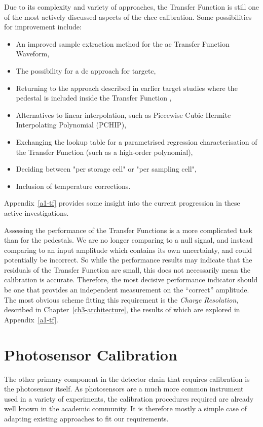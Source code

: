 Due to its complexity and variety of approaches, the Transfer Function is still one of the most actively discussed aspects of the \gls{chec} calibration. Some possibilities for improvement include:
\begin{itemize}
	\item An improved sample extraction method for the \gls{ac} Transfer Function Waveform,
	\item The possibility for a \gls{dc} approach for \gls{targetc},
	\item Returning to the approach described in earlier \gls{target} studies where the pedestal is included inside the Transfer Function \cite{Albert2017},
	\item Alternatives to linear interpolation, such as Piecewise Cubic Hermite Interpolating Polynomial (PCHIP),
	\item Exchanging the lookup table for a parametrised regression characterisation of the Transfer Function (such as a high-order polynomial),
	\item Deciding between "per storage cell" or "per sampling cell",
	\item Inclusion of temperature corrections.
\end{itemize}
Appendix~\ref{a1-tf} provides some insight into the current progression in these active investigations.

Assessing the performance of the Transfer Functions is a more complicated task than for the pedestals. We are no longer comparing to a null signal, and instead comparing to an input amplitude which contains its own uncertainty, and could potentially be incorrect. So while the performance results may indicate that the residuals of the Transfer Function are small, this does not necessarily mean the calibration is accurate. Therefore, the most decisive performance indicator should be one that provides an independent measurement on the ``correct'' amplitude. The most obvious scheme fitting this requirement is the \textit{Charge Resolution}, described in Chapter~\ref{ch3-architecture}, the results of which are explored in Appendix~\ref{a1-tf}.

\section{Photosensor Calibration} \label{section:photosensor_calib}

The other primary component in the detector chain that requires calibration is the photosensor itself. As photosensors are a much more common instrument used in a variety of experiments, the calibration procedures required are already well known in the academic community. It is therefore mostly a simple case of adapting existing approaches to fit our requirements.

